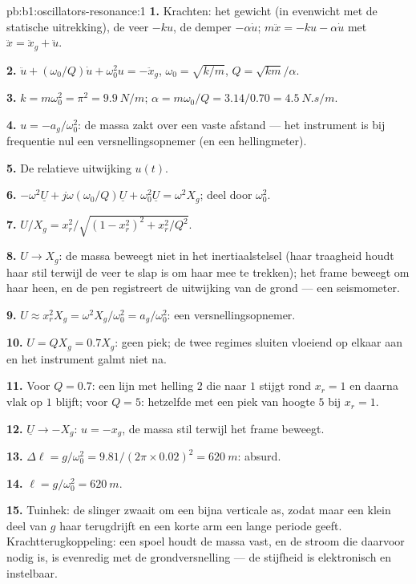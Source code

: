 \begin{solution}{pb:b1:oscillators-resonance:1}
\textbf{1.} Krachten: het gewicht (in evenwicht met de statische uitrekking), de veer
$-ku$, de demper $-\alpha\dot u$; $m\ddot x = -ku - \alpha\dot u$ met $\ddot x =
\ddot x_g + \ddot u$.

\textbf{2.} $\ddot u + (\omega_0/Q)\dot u + \omega_0^2u = -\ddot x_g$, $\omega_0 =
\sqrt{k/m}$, $Q = \sqrt{km}/\alpha$.

\textbf{3.} $k = m\omega_0^2 = \pi^2 = \qty{9.9}{N/m}$; $\alpha = m\omega_0/Q =
3.14/0.70 = \qty{4.5}{N.s/m}$.

\textbf{4.} $u = -a_g/\omega_0^2$: de massa zakt over een vaste afstand --- het
instrument is bij frequentie nul een versnellingsopnemer (en een hellingmeter).

\textbf{5.} De relatieve uitwijking $u(t)$.

\textbf{6.} $-\omega^2\underline U + j\omega(\omega_0/Q)\underline U + \omega_0^2\underline U
= \omega^2X_g$; deel door $\omega_0^2$.

\textbf{7.} $U/X_g = x_r^2/\sqrt{(1 - x_r^2)^2 + x_r^2/Q^2}$.

\textbf{8.} $U \to X_g$: de massa beweegt niet in het inertiaalstelsel
(haar traagheid houdt haar stil terwijl de veer te slap is om haar mee te trekken);
het frame beweegt om haar heen, en de pen registreert de uitwijking van de grond
--- een seismometer.

\textbf{9.} $U \approx x_r^2X_g = \omega^2X_g/\omega_0^2 = a_g/\omega_0^2$: een
versnellingsopnemer.

\textbf{10.} $U = QX_g = 0.7X_g$: geen piek; de twee regimes sluiten vloeiend
op elkaar aan en het instrument galmt niet na.

\textbf{11.} Voor $Q = 0.7$: een lijn met helling $2$ die naar $1$ stijgt rond
$x_r = 1$ en daarna vlak op $1$ blijft; voor $Q = 5$: hetzelfde met een piek van hoogte
$5$ bij $x_r = 1$.

\textbf{12.} $\underline U \to -X_g$: $u = -x_g$, de massa stil terwijl het
frame beweegt.

\textbf{13.} $\Delta\ell = g/\omega_0^2 = 9.81/(2\pi \times 0.02)^2 = \qty{620}{m}$:
absurd.

\textbf{14.} $\ell = g/\omega_0^2 = \qty{620}{m}$.

\textbf{15.} Tuinhek: de slinger zwaait om een bijna verticale
as, zodat maar een klein deel van $g$ haar terugdrijft en een korte arm
een lange periode geeft. Krachtterugkoppeling: een spoel houdt de massa vast, en de
stroom die daarvoor nodig is, is evenredig met de grondversnelling --- de
stijfheid is elektronisch en instelbaar.


\end{solution}
